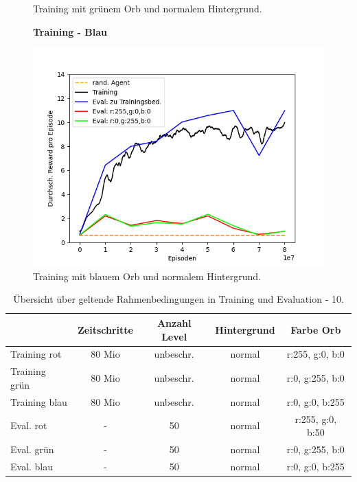 \begin{figure}[htp!]
\begin{minipage}{0.48\linewidth}
        \caption{Training mit grünem Orb und normalem Hintergrund.}
        \label{fig:grph_green_80Mio_inflvl_15act_Training_evalAsTraining}
    \end{minipage}
    \centering
    \begin{minipage}{0.48\linewidth}
    	\centering
        \textbf{Training - Blau}\par%
        \includegraphics[scale=0.358]{abb/_graphen/floor_80Mio_inflvl_15_act_TrainingBlau_evalRGB} 
        \caption{Training mit blauem Orb und normalem Hintergrund.}
        \label{fig:grph_blue_80Mio_inflvl_15act_Training_evalAsTraining}
    \end{minipage}
\end{figure}

\begin{center}
 \begin{table}[htp!]
 \begin{center}
  \begin{tabular}{ l c c c c }
    \hline
		               			& Zeitschritte & Anzahl Level & 		Hintergrund & Farbe Orb \\ \hline \hline
     Training rot              			& 80 Mio       & unbeschr.	  & 	    		normal & r:255, g:0, b:0 \\ \hline
     Training grün              			& 80 Mio       & unbeschr.	  & 	    		normal & r:0, g:255, b:0 \\ \hline
     Training blau             			& 80 Mio       & unbeschr.	  & 	    		normal & r:0, g:0, b:255 \\ \hline
     Eval. rot	 	& -	        	   & 50		  	  &			normal & r:255, g:0, b:50 \\ \hline
     Eval. grün	& -	        	   & 50		  & 	    				normal & r:0, g:255, b:0  \\ \hline
     Eval. blau 	& -	        	   & 50		  & 	    			normal & r:0, g:0, b:255  \\ \hline
    \hline
  \end{tabular}
  \caption{Übersicht über geltende Rahmenbedingungen in Training und Evaluation - 10.}
  \label{tab:tab_durch_EXP_trainSetting10}
  \end{center}
 \end{table}
\end{center} 

